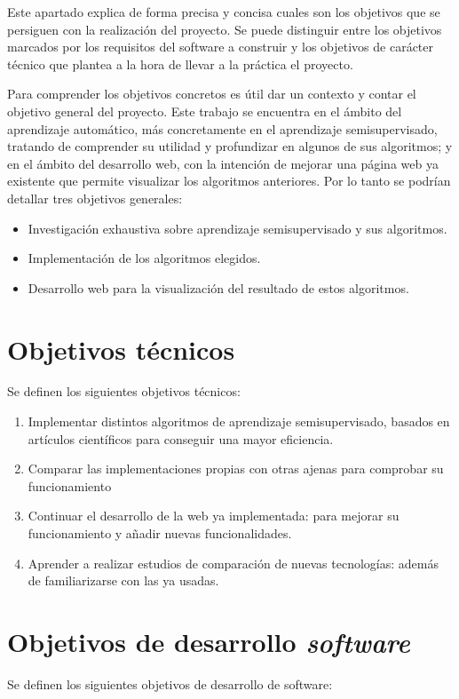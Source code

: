 
Este apartado explica de forma precisa y concisa cuales son los objetivos que se persiguen con la realización del proyecto. Se puede distinguir entre los objetivos marcados por los requisitos del software a construir y los objetivos de carácter técnico que plantea a la hora de llevar a la práctica el proyecto.

Para comprender los objetivos concretos es útil dar un contexto y contar el objetivo general del proyecto. Este trabajo se encuentra en el ámbito del aprendizaje automático, más concretamente en el aprendizaje semisupervisado, tratando de comprender su utilidad y profundizar en algunos de sus algoritmos; y en el ámbito del desarrollo web, con la intención de mejorar una página web ya existente que permite visualizar los algoritmos anteriores. Por lo tanto se podrían detallar tres objetivos generales:
\begin{itemize}
	\item Investigación exhaustiva sobre aprendizaje semisupervisado y sus algoritmos.
	\item Implementación de los algoritmos elegidos.
	\item Desarrollo web para la visualización del resultado de estos algoritmos.
\end{itemize}

\section{Objetivos técnicos}
Se definen los siguientes objetivos técnicos:

\begin{enumerate}
	\item Implementar distintos algoritmos de aprendizaje semisupervisado, basados en artículos científicos para conseguir una mayor eficiencia.
	\item Comparar las implementaciones propias con otras ajenas para comprobar su funcionamiento
	\item Continuar el desarrollo de la web ya implementada: para mejorar su funcionamiento y añadir nuevas funcionalidades.
	\item Aprender a realizar estudios de comparación de nuevas tecnologías: además de familiarizarse con las ya usadas.
\end{enumerate}

\section{Objetivos de desarrollo \textit{software}}
Se definen los siguientes objetivos de desarrollo de software:

